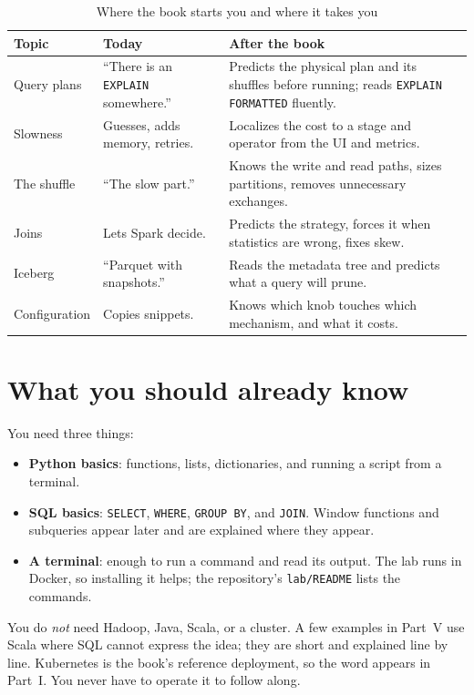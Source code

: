 \begin{table}[htbp]
\centering
\caption{Where the book starts you and where it takes you}
\label{tab:who-levels}
\small
\begin{tabularx}{\linewidth}{@{}l>{\raggedright\arraybackslash}X>{\raggedright\arraybackslash}X@{}}
\toprule
\textbf{Topic} & \textbf{Today} & \textbf{After the book} \\
\midrule
Query plans & ``There is an \texttt{EXPLAIN} somewhere.'' & Predicts the physical plan and its shuffles before running; reads \texttt{EXPLAIN FORMATTED} fluently. \\
Slowness & Guesses, adds memory, retries. & Localizes the cost to a stage and operator from the UI and metrics. \\
The shuffle & ``The slow part.'' & Knows the write and read paths, sizes partitions, removes unnecessary exchanges. \\
Joins & Lets Spark decide. & Predicts the strategy, forces it when statistics are wrong, fixes skew. \\
Iceberg & ``Parquet with snapshots.'' & Reads the metadata tree and predicts what a query will prune. \\
Configuration & Copies snippets. & Knows which knob touches which mechanism, and what it costs. \\
\bottomrule
\end{tabularx}
\end{table}

\section*{What you should already know}

You need three things:

\begin{itemize}
  \item \textbf{Python basics}: functions, lists, dictionaries, and running a script
  from a terminal.
  \item \textbf{SQL basics}: \texttt{SELECT}, \texttt{WHERE}, \texttt{GROUP BY}, and
  \texttt{JOIN}. Window functions and subqueries appear later and are explained
  where they appear.
  \item \textbf{A terminal}: enough to run a command and read its output. The
  lab runs in Docker, so installing it helps; the repository's \texttt{lab/README}
  lists the commands.
\end{itemize}

You do \emph{not} need Hadoop, Java, Scala, or a cluster. A few examples in
Part~V use Scala where SQL cannot express the idea; they are short and explained
line by line. Kubernetes is the book's reference deployment, so the word appears in
Part~I. You never have to operate it to follow along.

